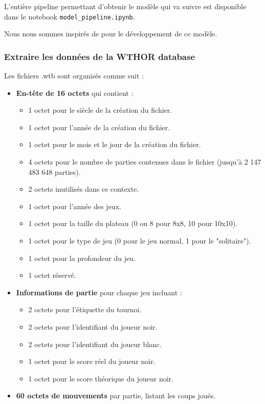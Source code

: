 L'entière pipeline permettant d'obtenir le modèle qui va suivre est disponible dans le notebook \texttt{model\_pipeline.ipynb}.

Nous nous sommes inspirés de \cite{Liskowski_2018} pour le développement de ce modèle.

\subsubsection{Extraire les données de la WTHOR database}
\label{subsubsec:wthor}
Les fichiers .wtb sont organisés comme suit :
\begin{itemize}
    \item \textbf{En-tête de 16 octets} qui contient :
    \begin{itemize}
        \item 1 octet pour le siècle de la création du fichier.
        \item 1 octet pour l'année de la création du fichier.
        \item 1 octet pour le mois et le jour de la création du fichier.
        \item 4 octets pour le nombre de parties contenues dans le fichier (jusqu'à 2 147 483 648 parties).
        \item 2 octets inutilisés dans ce contexte.
        \item 1 octet pour l'année des jeux.
        \item 1 octet pour la taille du plateau (0 ou 8 pour 8x8, 10 pour 10x10).
        \item 1 octet pour le type de jeu (0 pour le jeu normal, 1 pour le "solitaire").
        \item 1 octet pour la profondeur du jeu.
        \item 1 octet réservé.
    \end{itemize}
    \item \textbf{Informations de partie} pour chaque jeu incluant :
    \begin{itemize}
        \item 2 octets pour l'étiquette du tournoi.
        \item 2 octets pour l'identifiant du joueur noir.
        \item 2 octets pour l'identifiant du joueur blanc.
        \item 1 octet pour le score réel du joueur noir.
        \item 1 octet pour le score théorique du joueur noir.
    \end{itemize}
    \item \textbf{60 octets de mouvements} par partie, listant les coups joués.
\end{itemize}


